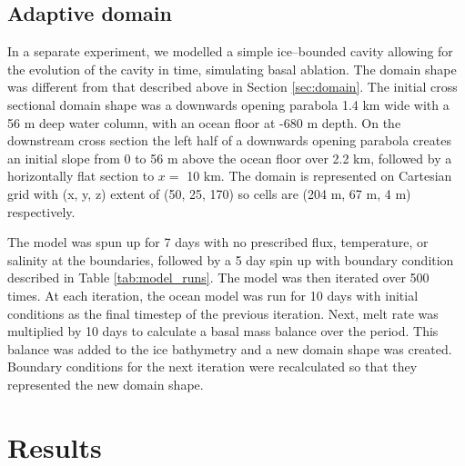 
\subsection{Adaptive domain} \label{sec:ablation_iterator}

In a separate experiment, we modelled a simple ice--bounded cavity allowing for the evolution of the cavity in time, simulating basal ablation. The domain shape was different from that described above in Section \ref{sec:domain}. The initial cross sectional domain shape was a downwards opening parabola 1.4 km wide with a 56 m deep water column, with an ocean floor at -680 m depth. On the downstream cross section the left half of a downwards opening parabola creates an initial slope from 0 to 56 m above the ocean floor over 2.2 km, followed by a horizontally flat section to $x=$  10 km. The domain is represented on Cartesian grid with (x, y, z) extent of (50, 25, 170) so cells are (204 m, 67 m, 4 m) respectively.

The model was spun up for 7 days with no prescribed flux, temperature, or salinity at the boundaries, followed by a 5 day spin up with boundary condition described in Table \ref{tab:model_runs}. The model was then iterated over 500 times. At each iteration, the ocean model was run for 10 days with initial conditions as the final timestep of the previous iteration. Next, melt rate was multiplied by 10 days to calculate a basal mass balance over the period. This balance was added to the ice bathymetry and a new domain shape was created. Boundary conditions for the next iteration were recalculated so that they represented the new domain shape.

\newpage

\section{Results}


